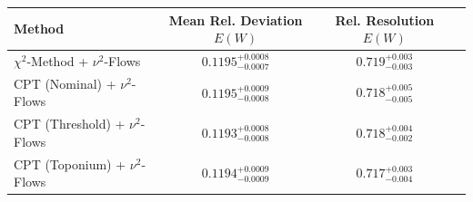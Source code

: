     \begin{tabular}{lccc}
        \toprule
        Method & Mean Rel. Deviation $E(W)$ & Rel. Resolution $E(W)$ \\
        \midrule
        $\chi^2$-Method + $\nu^2$-Flows & $0.1195^{+0.0008}_{-0.0007}$ & $0.719^{+0.003}_{-0.003}$ \\
        CPT (Nominal) + $\nu^2$-Flows & $0.1195^{+0.0009}_{-0.0008}$ & $0.718^{+0.005}_{-0.005}$ \\
        CPT (Threshold) + $\nu^2$-Flows & $0.1193^{+0.0008}_{-0.0008}$ & $0.718^{+0.004}_{-0.002}$ \\
        CPT (Toponium) + $\nu^2$-Flows & $0.1194^{+0.0009}_{-0.0009}$ & $0.717^{+0.003}_{-0.004}$ \\
        \bottomrule
    \end{tabular}
